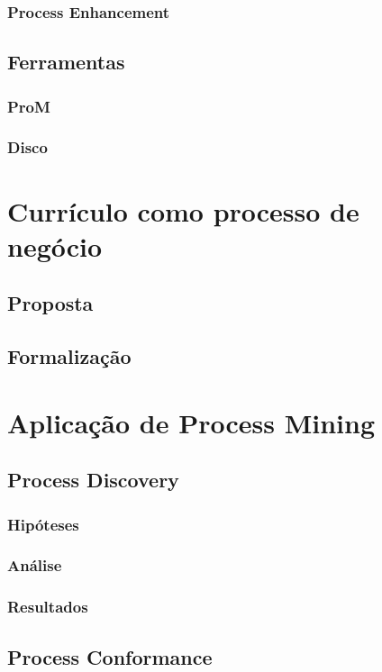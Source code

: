 \documentclass[a4paper]{article}
\begin{document}
\subsubsection{Process Enhancement}

\subsection{Ferramentas}
\subsubsection{ProM}
\subsubsection{Disco}

\section{Currículo como processo de negócio}

\subsection{Proposta}

\subsection{Formalização}

\section{Aplicação de Process Mining}

\subsection{Process Discovery}
\subsubsection{Hipóteses}
\subsubsection{Análise}
\subsubsection{Resultados}

\subsection{Process Conformance}
\end{document}

